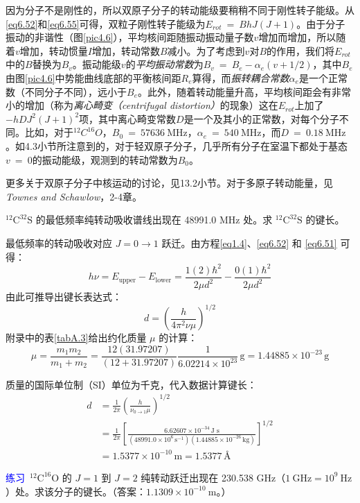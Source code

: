 \documentclass[12pt,a4paper,openany]{ctexbook}
\begin{document}
\begin{flushleft}
因为分子不是刚性的，所以双原子分子的转动能级要稍稍不同于刚性转子能级。从\eqref{eq6.52}和\eqref{eq6.55}可得，双粒子刚性转子能级为$E_{rot}\ =\ BhJ(J+1)$。由于分子振动的非谐性（图\ref{pic4.6}），平均核间距随振动振动量子数$v$增加而增加，所以随着$v$增加，转动惯量$I$增加，转动常数$B$减小。为了考虑到$v$对$B$的作用，我们将$E_{rot}$中的$B$替换为$B_v$。振动能级$v$的\textit{平均振动常数}为$B_v\ =\ B_e-\alpha_e(v+1/2)$，其中$B_e$由图\ref{pic4.6}中势能曲线底部的平衡核间距$R_e$算得，而\textit{振转耦合常数}$\alpha_e$是一个正常数（不同分子不同），远小于$B_e$。此外，随着转动能量升高，平均核间距会有非常小的增加（称为\textit{离心畸变（centrifugal distortion）}的现象）这在$E_{rot}$上加了$-hDJ^2(J+1)^2$项，其中离心畸变常数$D$是一个及其小的正常数，对每个分子不同。比如，对于$^{12}C^{16}O$，$B_0\ =\ 57636\ \mathrm{MHz}$，$\alpha_e\ =\ 540\ \mathrm{MHz}$，而$D\ =\ 0.18\ \mathrm{MHz}$。如4.3小节所注意到的，对于轻双原子分子，几乎所有分子在室温下都处于基态$v\ =\ 0$的振动能级，观测到的转动常数为$B_0$。

更多关于双原子分子中核运动的讨论，见13.2小节。对于多原子转动能量，见\textit{Townes  and  Schawlow}，2-4章。

\begin{examplebox}
    $^{12}\text{C}^{32}\text{S}$ 的最低频率纯转动吸收谱线出现在 48991.0 MHz 处。求 $^{12}\text{C}^{32}\text{S}$ 的键长。

最低频率的转动吸收对应 $J=0 \to 1$ 跃迁。由方程\eqref{eq1.4}、\eqref{eq6.52} 和 \eqref{eq6.51} 可得：
\[
h\nu = E_{\text{upper}} - E_{\text{lower}} = \frac{1(2)\hbar^2}{2\mu d^2} - \frac{0(1)\hbar^2}{2\mu d^2} \label{eq:rot_energy_diff}
\]
由此可推导出键长表达式：
\[
d = \left( \frac{h}{4\pi^2 \nu \mu} \right)^{1/2} \label{eq:bond_length_formula}
\]
附录中的表\ref{tabA.3}给出约化质量 $\mu$ 的计算：
\[
\mu = \frac{m_1 m_2}{m_1 + m_2} = \frac{12(31.97207)}{(12 + 31.97207)}\frac{1}{6.02214 \times 10^{23}} \, \text{g} = 1.44885 \times 10^{-23} \, \text{g}
\]

质量的国际单位制（SI）单位为千克，代入数据计算键长：
\[
\begin{aligned}
d &= \frac{1}{2\pi} \left( \frac{h}{\nu_{0\to1}\mu} \right)^{1/2} \\
&= \frac{1}{2\pi} \left[ \frac{6.62607 \times 10^{-34} \, \text{J s}}{(48991.0 \times 10^6 \, \text{s}^{-1})(1.44885 \times 10^{-26} \, \text{kg})} \right]^{1/2} \\
&= 1.5377 \times 10^{-10} \, \text{m} = 1.5377 \, \text{Å}
\end{aligned}
\]

\textcolor{blue}{\large 练习}\ $^{12}\text{C}^{16}\text{O}$ 的 $J=1$ 到 $J=2$ 纯转动跃迁出现在 230.538 GHz（$1\ \text{GHz} = 10^9\ \text{Hz}$）处。求该分子的键长。（答案：$1.1309 \times 10^{-10}\ \text{m}$。）

\end{examplebox}

\end{flushleft}
\end{document}
